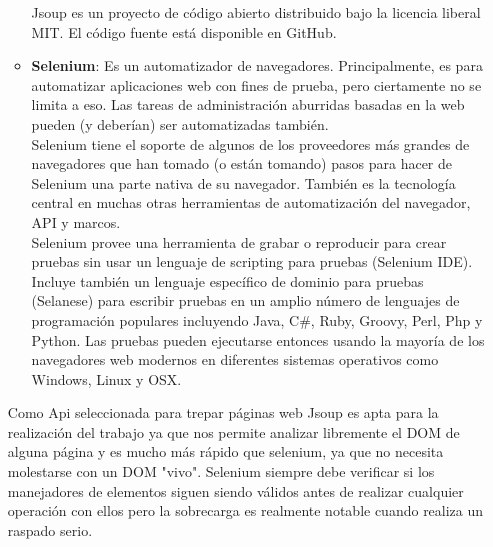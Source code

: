 \begin{itemize}
\begin{itemize}
				Jsoup es un proyecto de código abierto distribuido bajo la licencia liberal MIT. El código fuente está disponible en GitHub.\cite{jsoup}
				
				\item \textbf{Selenium}: Es un automatizador de navegadores. Principalmente, es para automatizar aplicaciones web con fines de prueba, pero ciertamente no se limita a eso. Las tareas de administración aburridas basadas en la web pueden (y deberían) ser automatizadas también.\\
				
				Selenium tiene el soporte de algunos de los proveedores más grandes de navegadores que han tomado (o están tomando) pasos para hacer de Selenium una parte nativa de su navegador. También es la tecnología central en muchas otras herramientas de automatización del navegador, API y marcos.\\
				
				Selenium provee una herramienta de grabar o reproducir para crear pruebas sin usar un lenguaje de scripting para pruebas (Selenium IDE). Incluye también un lenguaje específico de dominio para pruebas (Selanese) para escribir pruebas en un amplio número de lenguajes de programación populares incluyendo Java, C$\#$, Ruby, Groovy, Perl, Php y Python. Las pruebas pueden ejecutarse entonces usando la mayoría de los navegadores web modernos en diferentes sistemas operativos como Windows, Linux y OSX.
				
			\end{itemize}
		Como Api seleccionada para trepar páginas web Jsoup es apta para la realización del trabajo ya que nos permite analizar libremente el DOM de alguna página y es mucho más rápido que selenium, ya que no necesita molestarse con un DOM "vivo". Selenium siempre debe verificar si los manejadores de elementos siguen siendo válidos antes de realizar cualquier operación con ellos pero la sobrecarga es realmente notable cuando realiza un raspado serio. \\
			
	\end{itemize}
	
